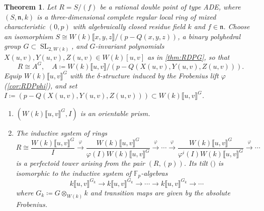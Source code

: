 \documentclass[uplatex,11pt,a4paper]{amsart} %
\numberwithin{equation}{section}
\numberwithin{figure}{section}
\numberwithin{table}{section}
\theoremstyle{plain}
\newtheorem{theorem}{Theorem}[section]
\theoremstyle{definition}
\newcommand{\xr}{\xrightarrow}
\newcommand{\F}{\mathbb{F}}
\newcommand{\n}{\mathfrak{n}}
\DeclareMathOperator{\SL}{SL}
\begin{document}
\begin{theorem}
\label{thm:RDPtower}
Let $R=S/(f)$ be a rational double point of type ADE, where $(S,\n,k)$ is a three-dimensional complete regular local ring of mixed characteristic $(0,p)$ with algebraically closed residue field $k$ and $f\in\n$.
Choose an isomorphism $S\cong W(k)\llbracket x,y,z\rrbracket/(p-Q(x,y,z))$, a binary polyhedral group $G\subset \SL_{2,W(k)}$, and $G$-invariant polynomials $X(u,v),Y(u,v),Z(u,v)\in W(k)[u,v]$ as in \textup{\cref{thm:RDPG}}, so that
\[
R\cong A^G,\quad A\coloneqq W(k)\llbracket u,v\rrbracket/(p-Q(X(u,v),Y(u,v),Z(u,v))).
\]
Equip $W(k)\llbracket u,v\rrbracket^G$ with the $\delta$-structure induced by the Frobenius lift $\varphi$ \textup{(\cref{cor:RDPphi})}, and set $I\coloneqq (p-Q(X(u,v),Y(u,v),Z(u,v))) \subset W(k)\llbracket u,v\rrbracket^G$.
  \begin{enumerate}
  \item $\left(W(k)\llbracket u,v\rrbracket^G, I\right)$ is an orientable prism.
  \item The inductive system of rings
  \[
  R\cong \frac{W(k)\llbracket u,v\rrbracket^G}{I} \xr{\varphi} \frac{W(k)\llbracket u,v\rrbracket^G}{\varphi(I)W(k)\llbracket u,v\rrbracket^G} \xr{\varphi}\cdots \xr{\varphi} \frac{W(k)\llbracket u,v\rrbracket^G}{\varphi^i(I)W(k)\llbracket u,v\rrbracket^G} \xr{\varphi} \cdots
  \]
  is a perfectoid tower arising from the pair $(R,(p))$. Its tilt $($\cite[Definition 3.29]{INS25}$)$ is isomorphic to the inductive system of $\F_p$-algebras
  \[
  k\llbracket u,v\rrbracket^{G_k} \to k\llbracket u,v\rrbracket^{G_k} \to \cdots \to k\llbracket u,v\rrbracket^{G_k} \to \cdots
  \]
  where $G_k\coloneqq G\otimes_{W(k)}k$ and transition maps are given by the absolute Frobenius.
  \end{enumerate}
\end{theorem}
\end{document}
